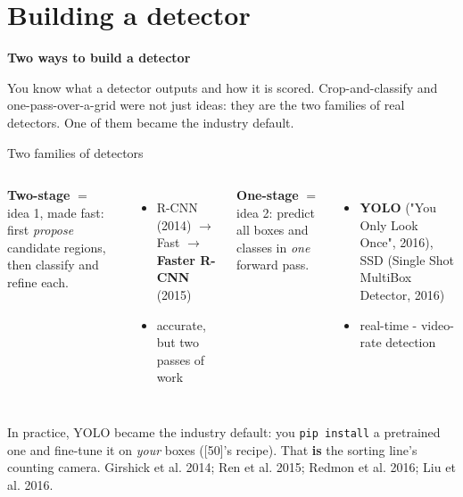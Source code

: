 \documentclass[aspectratio=169]{beamer}
\begin{document}
\section{Building a detector}

\begin{frame}[plain]
  \vfill
  \begin{center}
    {\Large\color{popblue}\textbf{Two ways to build a detector}}\\[0.9em]
    \begin{minipage}{0.82\textwidth}\centering\small
      You know what a detector outputs and how it is scored. Crop-and-classify and
      one-pass-over-a-grid were not just ideas: they are the two families of real detectors.
      One of them became the industry default.
    \end{minipage}
  \end{center}
  \vfill
\end{frame}

\begin{frame}{Two families of detectors}
  \begin{columns}[T]
    \textbf{Two-stage} $=$ idea 1, made fast: first \emph{propose} candidate regions, then
    classify and refine each.
    \begin{itemize}
      \item R-CNN (2014) $\to$ Fast $\to$ \textbf{Faster R-CNN} (2015)
      \item accurate, but two passes of work
    \end{itemize}
    \textbf{One-stage} $=$ idea 2: predict all boxes and classes in \emph{one} forward pass.
    \begin{itemize}
      \item \textbf{YOLO} ("You Only Look Once", 2016), SSD (Single Shot MultiBox
        Detector, 2016)
      \item real-time - video-rate detection
    \end{itemize}
  \end{columns}
  \vskip 8pt
  \vskip 6pt
  In practice, YOLO became the industry default: you \texttt{pip install} a pretrained
  one and fine-tune it on \emph{your} boxes ([50]'s recipe). That \textbf{is} the sorting
  line's counting camera.
  \vskip 4pt
  {\scriptsize\color{gray} Girshick et al. 2014; Ren et al. 2015; Redmon et al. 2016;
  Liu et al. 2016.}
\end{frame}
\end{document}
